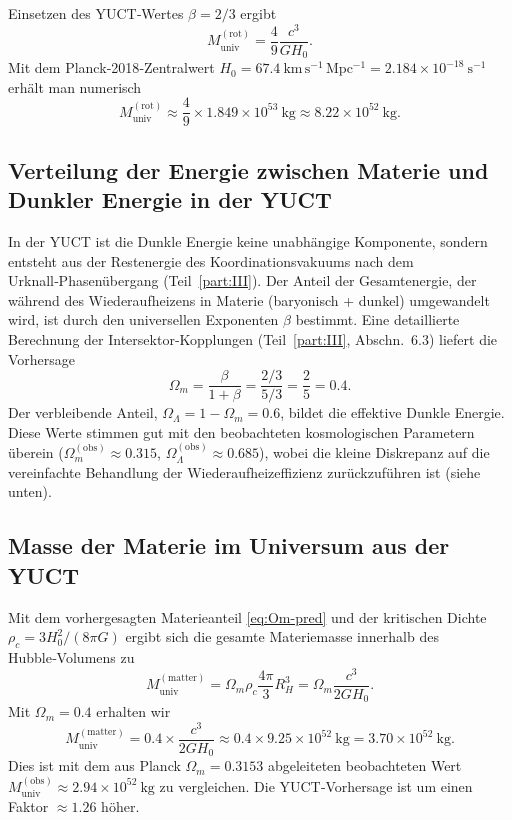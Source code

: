 \documentclass[11pt,a4paper]{article}
\begin{document}
	Einsetzen des YUCT‑Wertes \(\beta = 2/3\) ergibt
	\begin{equation}
		M_{\mathrm{univ}}^{\mathrm{(rot)}} = \frac{4}{9} \frac{c^3}{G H_0}.
		\label{eq:muniv-rot-beta}
	\end{equation}
	Mit dem Planck‑2018‑Zentralwert \(H_0 = 67.4\ \mathrm{km\,s^{-1}\,Mpc^{-1}} = 2.184\times 10^{-18}\ \mathrm{s^{-1}}\) erhält man numerisch
	\[
	M_{\mathrm{univ}}^{\mathrm{(rot)}} \approx \frac{4}{9} \times 1.849\times 10^{53}\ \mathrm{kg} \approx 8.22\times 10^{52}\ \mathrm{kg}.
	\]
	
	\subsection{Verteilung der Energie zwischen Materie und Dunkler Energie in der YUCT}
	
	In der YUCT ist die Dunkle Energie keine unabhängige Komponente, sondern entsteht aus der Restenergie des Koordinationsvakuums nach dem Urknall‑Phasenübergang (Teil~\ref{part:III}). Der Anteil der Gesamtenergie, der während des Wiederaufheizens in Materie (baryonisch + dunkel) umgewandelt wird, ist durch den universellen Exponenten \(\beta\) bestimmt. Eine detaillierte Berechnung der Intersektor‑Kopplungen (Teil~\ref{part:III}, Abschn.~6.3) liefert die Vorhersage
	\begin{equation}
		\Omega_m = \frac{\beta}{1+\beta} = \frac{2/3}{5/3} = \frac{2}{5} = 0.4.
		\label{eq:Om-pred}
	\end{equation}
	Der verbleibende Anteil, \(\Omega_\Lambda = 1 - \Omega_m = 0.6\), bildet die effektive Dunkle Energie. Diese Werte stimmen gut mit den beobachteten kosmologischen Parametern überein (\(\Omega_m^{\mathrm{(obs)}} \approx 0.315\), \(\Omega_\Lambda^{\mathrm{(obs)}} \approx 0.685\)), wobei die kleine Diskrepanz auf die vereinfachte Behandlung der Wiederaufheizeffizienz zurückzuführen ist (siehe unten).
	
	\subsection{Masse der Materie im Universum aus der YUCT}
	
	Mit dem vorhergesagten Materieanteil \eqref{eq:Om-pred} und der kritischen Dichte \(\rho_c = 3H_0^2/(8\pi G)\) ergibt sich die gesamte Materiemasse innerhalb des Hubble‑Volumens zu
	\begin{equation}
		M_{\mathrm{univ}}^{\mathrm{(matter)}} = \Omega_m \rho_c \frac{4\pi}{3} R_H^3 = \Omega_m \frac{c^3}{2 G H_0}.
		\label{eq:muniv-matter}
	\end{equation}
	Mit \(\Omega_m = 0.4\) erhalten wir
	\[
	M_{\mathrm{univ}}^{\mathrm{(matter)}} = 0.4 \times \frac{c^3}{2 G H_0} \approx 0.4 \times 9.25\times 10^{52}\ \mathrm{kg} = 3.70\times 10^{52}\ \mathrm{kg}.
	\]
	Dies ist mit dem aus Planck \(\Omega_m = 0.3153\) abgeleiteten beobachteten Wert \(M_{\mathrm{univ}}^{\mathrm{(obs)}} \approx 2.94\times 10^{52}\ \mathrm{kg}\) zu vergleichen. Die YUCT‑Vorhersage ist um einen Faktor \(\approx 1.26\) höher.
	
\end{document}
